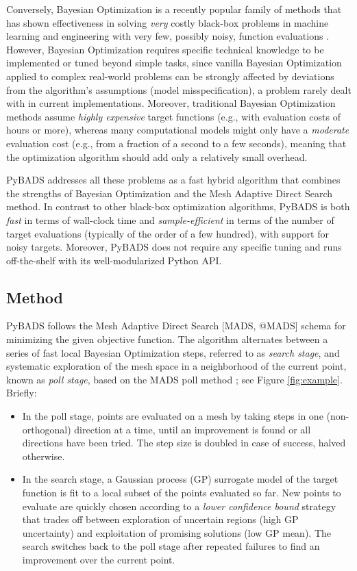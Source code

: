 \documentclass[
]{article}
\begin{document}
Conversely, Bayesian Optimization is a recently popular family of methods that has shown effectiveness in solving \textit{very} costly black-box problems in machine learning and engineering with very few, possibly noisy, function evaluations \parencite{garnett_bayesoptbook_2023, reviewBO, agnihotri2020exploring}. However, Bayesian Optimization requires specific technical knowledge to be implemented or tuned beyond simple tasks, since vanilla Bayesian Optimization applied to complex real-world problems can be strongly affected by deviations from the algorithm's assumptions (model misspecification), a problem rarely dealt with in current implementations. Moreover, traditional Bayesian Optimization methods assume \textit{highly expensive} target functions (e.g., with evaluation costs of hours or more), whereas many computational models might only have a \textit{moderate} evaluation cost (e.g., from a fraction of a second to a few seconds), meaning that the optimization algorithm should add only a relatively small overhead. 

PyBADS addresses all these problems as a fast hybrid algorithm that combines the strengths of Bayesian Optimization and the Mesh Adaptive Direct Search \cite{MADS} method. In contrast to other black-box optimization algorithms, PyBADS is both \textit{fast} in terms of wall-clock time and \textit{sample-efficient} in terms of the number of target evaluations (typically of the order of a few hundred), with support for noisy targets. Moreover, PyBADS does not require any specific tuning and runs off-the-shelf with its well-modularized Python API.

\hypertarget{method}{%
\subsection{Method}\label{method}}
PyBADS follows the Mesh Adaptive Direct Search [MADS, @MADS] schema for minimizing the given objective function. The algorithm alternates between a series of fast local Bayesian Optimization steps, referred to as \textit{search stage}, and systematic exploration of the mesh space in a neighborhood of the current point, known as \textit{poll stage}, based on the MADS poll method \parencite{MADS}; see Figure \ref{fig:example}.
Briefly:

\begin{itemize}
    \item In the poll stage, points are evaluated on a mesh by taking steps in one (non-orthogonal) direction at a time, until an improvement is found or all directions have been tried. The step size is doubled in case of success, halved otherwise.
    \item In the search stage, a Gaussian process (GP) surrogate model \parencite{rasmussen_gaussian_2006} of the target function is fit to a local subset of the points evaluated so far. New points to evaluate are quickly chosen according to a \textit{lower confidence bound} strategy that trades off between exploration of uncertain regions (high GP uncertainty) and exploitation of promising solutions (low GP mean). The search switches back to the poll stage after repeated failures to find an improvement over the current point.
\end{itemize}
\end{document}
